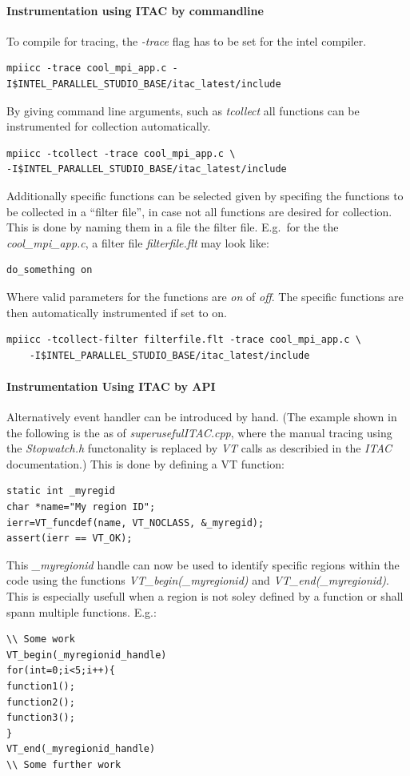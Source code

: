 \documentclass[article]{scrartcl}
\begin{document}
\paragraph{Instrumentation using ITAC by commandline}

To compile for tracing, the \textit{-trace} flag has to be set for the intel compiler.
\begin{verbatim}
mpiicc -trace cool_mpi_app.c -I$INTEL_PARALLEL_STUDIO_BASE/itac_latest/include
\end{verbatim}

By giving command line arguments, such as \textit{tcollect} all functions can be instrumented for collection automatically.
\begin{verbatim}
mpiicc -tcollect -trace cool_mpi_app.c \
-I$INTEL_PARALLEL_STUDIO_BASE/itac_latest/include
\end{verbatim}

Additionally specific functions can be selected given by specifing the functions to be collected in a ``filter file'', in case not all functions are desired for collection.
This is done by naming them in a file the filter file.
E.g.\ for the the \textit{cool\_mpi\_app.c}, a filter file \textit{filterfile.flt} may look like:
\begin{verbatim}
do_something on
\end{verbatim}
Where valid parameters for the functions are \textit{on} of \textit{off}.
The specific functions are then automatically instrumented if set to on.
\begin{verbatim}
mpiicc -tcollect-filter filterfile.flt -trace cool_mpi_app.c \
	-I$INTEL_PARALLEL_STUDIO_BASE/itac_latest/include
\end{verbatim}

\paragraph{Instrumentation Using ITAC by API}
Alternatively event handler can be introduced by hand. 
(The example shown in the following is the as of \textit{superusefulITAC.cpp}, where the manual tracing using the \textit{Stopwatch.h} functonality is replaced by \textit{VT} calls as describied in the \textit{ITAC} documentation.)
This is done by defining a VT function:
\begin{verbatim}
static int _myregid
char *name="My region ID";
ierr=VT_funcdef(name, VT_NOCLASS, &_myregid);
assert(ierr == VT_OK);
\end{verbatim}
This \textit{\_myregionid} handle can now be used to identify specific regions within the code using the functions
\textit{VT\_begin(\_myregionid)} and \textit{VT\_end(\_myregionid)}. 
This is especially usefull when a region is not soley defined by a function or shall spann multiple functions. E.g.:
\begin{verbatim}
\\ Some work
VT_begin(_myregionid_handle)
for(int=0;i<5;i++){
function1();
function2();
function3();
}
VT_end(_myregionid_handle)
\\ Some further work
\end{verbatim}
\end{document}

